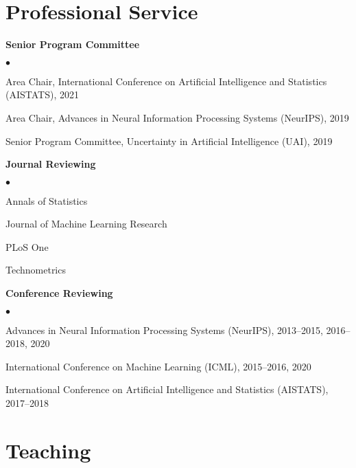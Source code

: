 \documentclass[margin,line]{res}
\newenvironment{list2}{
  \begin{list}{$\bullet$}{%
      \setlength{\itemsep}{0in}
      \setlength{\parsep}{0in} \setlength{\parskip}{0in}
      \setlength{\topsep}{0in} \setlength{\partopsep}{0in}
      \setlength{\leftmargin}{0.2in}}}{\end{list}}
\begin{document}
\begin{resume}
\section{\sc Professional Service}
\textbf{Senior Program Committee}
\begin{list2}
\item {Area Chair}, International Conference on Artificial Intelligence and Statistics (AISTATS), 2021
\item {Area Chair}, Advances in Neural Information Processing Systems (NeurIPS), 2019
\item {Senior Program Committee}, Uncertainty in Artificial Intelligence (UAI), 2019
\end{list2}

\textbf{Journal Reviewing}
\begin{list2}
\item Annals of Statistics
\item Journal of Machine Learning Research
\item PLoS One
\item Technometrics
\end{list2}

\textbf{Conference Reviewing}
\begin{list2}
\item Advances in Neural Information Processing Systems (NeurIPS), 2013--2015, 2016--2018, 2020
\item International Conference on Machine Learning (ICML), 2015--2016, 2020
\item International Conference on Artificial Intelligence and Statistics (AISTATS), 2017--2018
\end{list2}

%

\section{\sc Teaching}


\end{resume}
\end{document}
